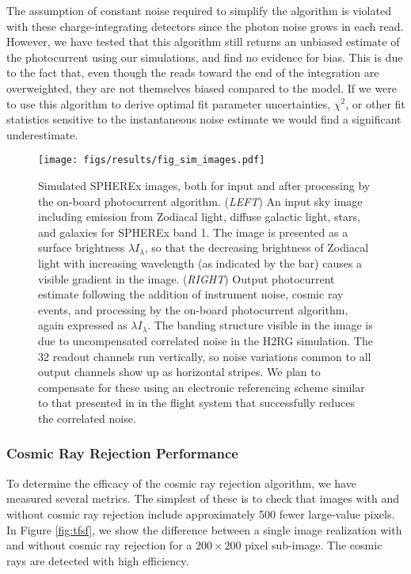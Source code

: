 \documentclass{ws-jai}
\begin{document}
The assumption of constant noise required to simplify the algorithm is
violated with these charge-integrating detectors since the photon
noise grows in each read.  However, we have tested that this algorithm
still returns an unbiased estimate of the photocurrent using our
simulations, and find no evidence for bias.  This is due to the fact
that, even though the reads toward the end of the integration are
overweighted, they are not themselves biased compared to the model.
If we were to use this algorithm to derive optimal fit parameter
uncertainties, $\chi^{2}$, or other fit statistics sensitive to the
instantaneous noise estimate we would find a significant underestimate.

\begin{figure*}[ht]
\centering
\texttt{[image: figs/results/fig\_sim\_images.pdf]}
\caption{Simulated SPHEREx images, both for input and after processing
  by the on-board photocurrent algorithm.  (\textit{LEFT}) An input
  sky image including emission from Zodiacal light, diffuse galactic
  light, stars, and galaxies for SPHEREx band 1.  The image is
  presented as a surface brightness $\lambda I_{\lambda}$, so that the
  decreasing brightness of Zodiacal light with increasing wavelength
  (as indicated by the bar) causes a visible gradient in the image.
  (\textit{RIGHT}) Output photocurrent estimate following the addition
  of instrument noise, cosmic ray events, and processing by the
  on-board photocurrent algorithm, again expressed as
  $\lambda I_{\lambda}$.  The banding structure visible in the image
  is due to uncompensated correlated noise in the H2RG simulation.
  The 32 readout channels run vertically, so noise variations common
  to all output channels show up as horizontal stripes.  We plan to
  compensate for these using an electronic referencing scheme similar
  to that presented in \citet{Moseley2010} in the flight
  system that successfully reduces the correlated noise.  \label{fig:output} }
\end{figure*}


\subsubsection{Cosmic Ray Rejection Performance}
\label{ssS:crperformance}

To determine the efficacy of the cosmic ray rejection algorithm, we
have measured several metrics.  The simplest of these is to check that
images with and without cosmic ray rejection include approximately 500
fewer large-value pixels.  In Figure \ref{fig:tfsf}, we show the
difference between a single image realization with and without cosmic
ray rejection for a $200 \times 200$ pixel sub-image.  The cosmic
rays are detected with high efficiency.
\end{document}
